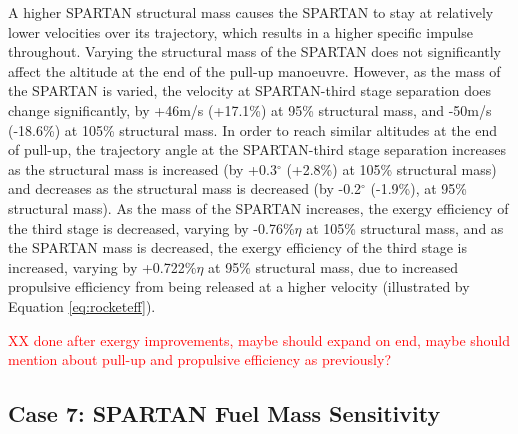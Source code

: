 A higher SPARTAN structural mass causes the SPARTAN to stay at relatively lower velocities over its trajectory, which results in a higher specific impulse throughout. 
Varying the structural mass of the SPARTAN does not significantly affect the altitude at the end of the pull-up manoeuvre. However, as the mass of the SPARTAN is varied, the velocity at SPARTAN-third stage separation does change significantly, by +46m/s (+17.1\%) at 95\% structural mass, and -50m/s (-18.6\%) at 105\% structural mass. In order to reach similar altitudes at the end of pull-up, the trajectory angle at the SPARTAN-third stage separation increases as the structural mass is increased (by +0.3$^\circ$ (+2.8\%) at 105\% structural mass) and decreases as the structural mass is decreased (by -0.2$^\circ$ (-1.9\%), at 95\% structural mass). 
As the mass of the SPARTAN increases, the exergy efficiency of the third stage is decreased, varying by -0.76\%$\eta$ at 105\% structural mass, and as the SPARTAN mass is decreased, the exergy efficiency of the third stage is increased, varying by +0.722\%$\eta$ at 95\% structural mass, due to increased propulsive efficiency from being released at a higher velocity (illustrated by Equation \ref{eq:rocketeff}). 

\textcolor{red}{XX done after exergy improvements, maybe should expand on end, maybe should mention about pull-up and propulsive efficiency as previously?}

\subsection{Case 7: SPARTAN Fuel Mass Sensitivity} \label{sec:fuelmassNoReturn}

